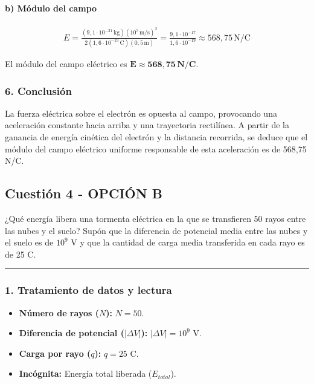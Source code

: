 \paragraph{b) Módulo del campo}
\begin{gather}
    E = \frac{(9,1 \cdot 10^{-31}\,\text{kg}) (10^7\,\text{m/s})^2}{2 (1,6 \cdot 10^{-19}\,\text{C}) (0,5\,\text{m})} = \frac{9,1 \cdot 10^{-17}}{1,6 \cdot 10^{-19}} \approx 568,75 \, \text{N/C}
\end{gather}
\begin{cajaresultado}
El módulo del campo eléctrico es $\boldsymbol{E \approx 568,75 \, \textbf{N/C}}$.
\end{cajaresultado}

\subsubsection*{6. Conclusión}
\begin{cajaconclusion}
La fuerza eléctrica sobre el electrón es opuesta al campo, provocando una aceleración constante hacia arriba y una trayectoria rectilínea. A partir de la ganancia de energía cinética del electrón y la distancia recorrida, se deduce que el módulo del campo eléctrico uniforme responsable de esta aceleración es de 568,75 N/C.
\end{cajaconclusion}

\newpage

\subsection{Cuestión 4 - OPCIÓN B}
\label{subsec:4B_2010_jun_ord}
\begin{cajaenunciado}
¿Qué energía libera una tormenta eléctrica en la que se transfieren 50 rayos entre las nubes y el suelo? Supón que la diferencia de potencial media entre las nubes y el suelo es de $10^9$ V y que la cantidad de carga media transferida en cada rayo es de 25 C.
\end{cajaenunciado}
\hrule

\subsubsection*{1. Tratamiento de datos y lectura}
\begin{itemize}
    \item \textbf{Número de rayos ($N$):} $N = 50$.
    \item \textbf{Diferencia de potencial ($|\Delta V|$):} $|\Delta V| = 10^9$ V.
    \item \textbf{Carga por rayo ($q$):} $q = 25$ C.
    \item \textbf{Incógnita:} Energía total liberada ($E_{total}$).
\end{itemize}

